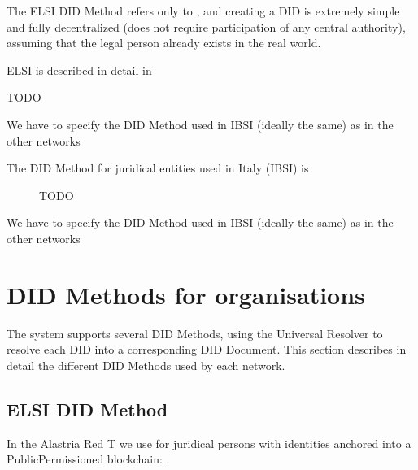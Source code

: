 \documentclass[a4paper,12pt,english]{sphinxhowto}
\begin{document}
\begin{description}
\sphinxAtStartPar
The ELSI DID Method refers only to , and creating a DID is extremely simple and fully decentralized (does not require participation of any central authority), assuming that the legal person already exists in the real world.

\sphinxAtStartPar
ELSI is described in detail in {\hyperref[\detokenize{ssi/didmethods::doc}]{}}

\item[{The DID Method for juridical entities used in Slovenia (SI\sphinxhyphen{}Chain) is \sphinxstylestrong{xxxx}}] \leavevmode
\sphinxAtStartPar
TODO

\end{description}

\begin{sphinxShadowBox}

\sphinxAtStartPar
We have to specify the DID Method used in IBSI (ideally the same) as in the other networks
\end{sphinxShadowBox}
\begin{description}
\item[{The DID Method for juridical entities used in Italy (IBSI) is }] \leavevmode
\sphinxAtStartPar
TODO

\end{description}

\begin{sphinxShadowBox}

\sphinxAtStartPar
We have to specify the DID Method used in IBSI (ideally the same) as in the other networks
\end{sphinxShadowBox}


\section{DID Methods for organisations}
\label{\detokenize{ssi/didmethods:did-methods-for-organisations}}\label{\detokenize{ssi/didmethods::doc}}
\sphinxAtStartPar
The system supports several DID Methods, using the Universal Resolver to resolve each DID into a corresponding DID Document.
This section describes in detail the different DID Methods used by each network.


\subsection{ELSI DID Method}
\label{\detokenize{ssi/didmethods:elsi-did-method}}
\sphinxAtStartPar
In the Alastria Red T we use  for juridical persons with identities anchored into a Public\sphinxhyphen{}Permissioned blockchain: .
\end{document}
